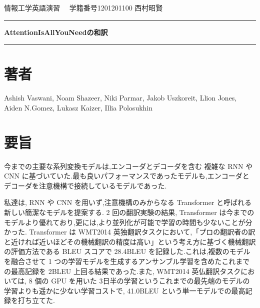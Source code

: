 \documentclass{jarticle}     %
\begin{document}
  \noindent
  \onecolumn
  \hspace{1em}

  情報工学英語演習
  \hfill
  \ \  学籍番号1201201100 西村昭賢 

  \vspace{2mm}
  \hrule
  \begin{center}
  {\Large \bf AttentionIsAllYouNeedの和訳}
  \end{center}
  \hrule
  \vspace{3mm}

\section*{著者}
Ashish Vaswani, Noam Shazeer, Niki Parmar, Jakob Uszkoreit, Llion Jones, Aiden N.Gomez, Lukasz Kaizer, Illia Polosukhin\cite{Transformer}

\section*{要旨}
今までの主要な系列変換モデルは,エンコーダとデコーダを含む
複雑な RNN や CNN に基づいていた.最も良いパフォーマンスであったモデルも,エンコーダとデコーダを注意機構で接続しているモデルであった.\par
私達は, RNN や CNN を用いず,注意機構のみからなる Transformer と呼ばれる新しい簡潔なモデルを提案する. 2 回の翻訳実験の結果, Transformer は今までのモデルより優れており,更には,より並列化が可能で学習の時間も少ないことが分かった.
Transformer は WMT2014 英独翻訳タスクにおいて,「プロの翻訳者の訳と近ければ近いほどその機械翻訳の精度は高い」という考え方に基づく機械翻訳の評価方法である BLEU スコア\cite{BLEU}で 28.4BLEU を記録した.これは,複数のモデルを融合させて 1 つの学習モデルを生成するアンサンブル学習\cite{ensemble}を含めたこれまでの最高記録を 2BLEU 上回る結果であった.また, WMT2014 英仏翻訳タスクにおいては, 8 個の GPU を用いた 3日半の学習というこれまでの最先端のモデルの学習よりも遥かに少ない学習コストで, 41.0BLEU という単一モデルでの最高記録を打ち立てた.

\end{document}
